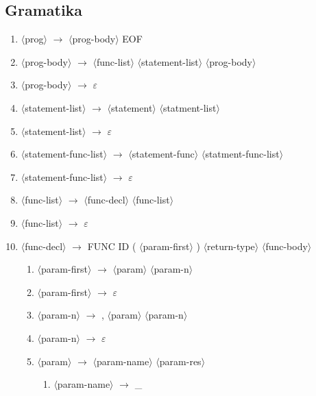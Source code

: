 \documentclass[a4paper]{article}
\newcommand{\red}[1]{{\color{red} #1}}
\begin{document}
\subsection{Gramatika}
\begin{enumerate}
    \item $\langle$prog$\rangle$ $\rightarrow$ $\langle$prog-body$\rangle$ \red{EOF}
    \item $\langle$prog-body$\rangle$ $\rightarrow$ $\langle$func-list$\rangle$ $\langle$statement-list$\rangle$ $\langle$prog-body$\rangle$
    \item $\langle$prog-body$\rangle$ $\rightarrow$ \red{\red{$\varepsilon$}}
    \item $\langle$statement-list$\rangle$ $\rightarrow$ $\langle$statement$\rangle$ $\langle$statment-list$\rangle$
    \item $\langle$statement-list$\rangle$ $\rightarrow$ \red{$\varepsilon$}
    \item $\langle$statement-func-list$\rangle$ $\rightarrow$ $\langle$statement-func$\rangle$ $\langle$statment-func-list$\rangle$
    \item $\langle$statement-func-list$\rangle$ $\rightarrow$ \red{$\varepsilon$}
    \item $\langle$func-list$\rangle$ $\rightarrow$ $\langle$func-decl$\rangle$ $\langle$func-list$\rangle$
    \item $\langle$func-list$\rangle$ $\rightarrow$ \red{$\varepsilon$}
    \item  $\langle$func-decl$\rangle$ $\rightarrow$ \red{FUNC ID (} $\langle$param-first$\rangle$ \red{)} $\langle$return-type$\rangle$ $\langle$func-body$\rangle$
    \begin{enumerate}
        \item $\langle$param-first$\rangle$ $\rightarrow$ $\langle$param$\rangle$ $\langle$param-n$\rangle$
        \item $\langle$param-first$\rangle$ $\rightarrow$ \red{$\varepsilon$}
        \item $\langle$param-n$\rangle$ $\rightarrow$ \red{,} $\langle$param$\rangle$ $\langle$param-n$\rangle$
        \item $\langle$param-n$\rangle$ $\rightarrow$ \red{$\varepsilon$}
        \item $\langle$param$\rangle$ $\rightarrow$ $\langle$param-name$\rangle$ $\langle$param-res$\rangle$ 
        \begin{enumerate}
            \item $\langle$param-name$\rangle$ $\rightarrow$ \red{\_}

\end{enumerate}
\end{enumerate}
\end{enumerate}
\end{document}

